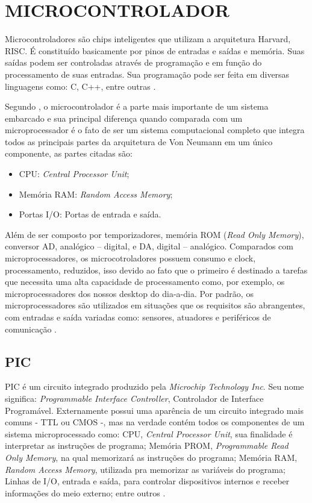 \section{MICROCONTROLADOR}
Microcontroladores são chips inteligentes que utilizam a arquitetura Harvard, RISC. É constituído basicamente por pinos de entradas e saídas e memória. Suas saídas podem ser controladas através de programação e em função do processamento de suas entradas. Sua programação pode ser feita em diversas linguagens como: C, C++, entre outras \cite{radio2012amadores}.

Segundo \cite{ganssle1999art}, o microcontrolador é a parte mais importante de um sistema embarcado e sua principal diferença quando comparada com um microprocessador é o fato de ser um sistema computacional completo que integra todos as principais partes da arquitetura de Von Neumann em um único componente, as partes citadas são:
\begin{itemize}
\item CPU: \emph{Central Processor Unit};
\item Memória RAM: \emph{Random Access Memory};
\item Portas I/O: Portas de entrada e saída.
\end{itemize}

Além de ser composto por temporizadores, memória ROM (\emph{Read Only Memory}), conversor AD, analógico – digital, e DA, digital – analógico.
Comparados com microprocessadores, os microcotroladores possuem consumo e clock, processamento, reduzidos, isso devido ao fato que o primeiro é destinado a tarefas que necessita uma alta capacidade de processamento como, por exemplo, os microprocessadores dos nossos desktop do dia-a-dia. Por padrão, os microprocessadores são utilizados em situações que os requisitos são abrangentes, com entradas e saída variadas como: sensores, atuadores e periféricos de comunicação \cite{lee2011introduction}.

\subsection{PIC}
PIC é um circuito integrado produzido pela \emph{Microchip Technology Inc}. Seu nome significa: \emph{Programmable Interface Controller}, Controlador de Interface Programável. Externamente possui uma aparência de um circuito integrado mais comuns - TTL ou CMOS -, mas na verdade contém todos os componentes de um sistema microprocessado como: CPU, \emph{Central Processor Unit}, sua finalidade é interpretar as instruções de programa; Memória PROM, \emph{Programmable Read Only Memory}, na qual memorizará as instruções do programa; Memória RAM, \emph{Random Access Memory}, utilizada pra memorizar as variáveis do programa; Linhas de I/O, entrada e saída, para controlar dispositivos internos e receber informações do meio externo; entre outros \cite{radio2012amadores,wikipedia2012pic}.

